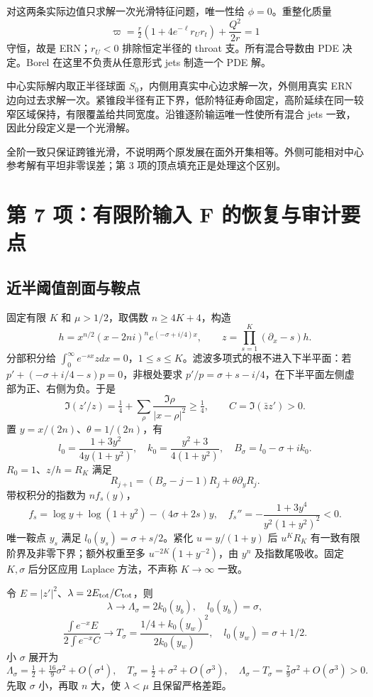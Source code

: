 对这两条实际边值只求解一次光滑特征问题，唯一性给 $\phi=0$。重整化质量
\[
\varpi=\tfrac r2(1+4e^{-\ell}r_Ur_t)+\frac{Q^2}{2r}=1
\]
守恒，故是 ERN；$r_U<0$ 排除恒定半径的 throat 支。所有混合导数由 PDE 决定。Borel 在这里不负责从任意形式 jets 制造一个 PDE 解。

中心实际解内取正半径球面 $S_0$，内侧用真实中心边求解一次，外侧用真实 ERN 边向过去求解一次。紧锥段半径有正下界，低阶特征寿命固定，高阶延续在同一较窄区域保持，有限覆盖给共同宽度。沿锥逐阶输运唯一性使所有混合 jets 一致，因此分段定义是一个光滑解。

全阶一致只保证跨锥光滑，不说明两个原发展在面外开集相等。外侧可能相对中心参考解有平坦非零误差；第 3 项的顶点填充正是处理这个区别。

\section{第 7 项：有限阶输入 F 的恢复与审计要点}
\subsection{近半阈值剖面与鞍点}
固定有限 $K$ 和 $\mu>1/2$，取偶数 $n\ge4K+4$，构造
\[
h=x^{n/2}(x-2ni)^ne^{(-\sigma+i/4)x},\qquad
z=\prod_{s=1}^K(\partial_x-s)h.
\]
分部积分给 $\int_0^\infty e^{-sx}zdx=0$，$1\le s\le K$。滤波多项式的根不进入下半平面：若 $p'+(-\sigma+i/4-s)p=0$，非根处要求 $p'/p=\sigma+s-i/4$，在下半平面左侧虚部为正、右侧为负。于是
\[
\Im(z'/z)=\tfrac14+\sum_\rho\frac{\Im\rho}{|x-\rho|^2}\ge\tfrac14,
\qquad C=\Im(\bar z z')>0.
\]
置 $y=x/(2n)$、$\theta=1/(2n)$，有
\[
l_0=\frac{1+3y^2}{4y(1+y^2)},\quad
k_0=\frac{y^2+3}{4(1+y^2)},\quad B_\sigma=l_0-\sigma+ik_0.
\]
$R_0=1$、$z/h=R_K$ 满足
\[
R_{j+1}=(B_\sigma-j-1)R_j+\theta\partial_yR_j.
\]
带权积分的指数为 $nf_s(y)$，
\[
f_s=\log y+\log(1+y^2)-(4\sigma+2s)y,
\quad f_s''=-\frac{1+3y^4}{y^2(1+y^2)^2}<0.
\]
唯一鞍点 $y_s$ 满足 $l_0(y_s)=\sigma+s/2$。紧化 $u=y/(1+y)$ 后 $u^KR_K$ 有一致有限阶界及非零下界；额外权重至多 $u^{-2K}(1+y^{-2})$，由 $y^n$ 及指数尾吸收。固定 $K,\sigma$ 后分区应用 Laplace 方法，不声称 $K\to\infty$ 一致。

令 $E=|z'|^2$、$\lambda=2E_{\rm tot}/C_{\rm tot}$，则
\[
\lambda\to\Lambda_\sigma=2k_0(y_b),\quad l_0(y_b)=\sigma,
\]
\[
\frac{\int e^{-x}E}{2\int e^{-x}C}\to
T_\sigma=\frac{1/4+k_0(y_w)^2}{2k_0(y_w)},\quad
l_0(y_w)=\sigma+1/2.
\]
小 $\sigma$ 展开为
\[
\Lambda_\sigma=\tfrac12+\tfrac{16}{9}\sigma^2+O(\sigma^4),\quad
T_\sigma=\tfrac12+\sigma^2+O(\sigma^3),\quad
\Lambda_\sigma-T_\sigma=\tfrac79\sigma^2+O(\sigma^3)>0.
\]
先取 $\sigma$ 小，再取 $n$ 大，使 $\lambda<\mu$ 且保留严格差距。

